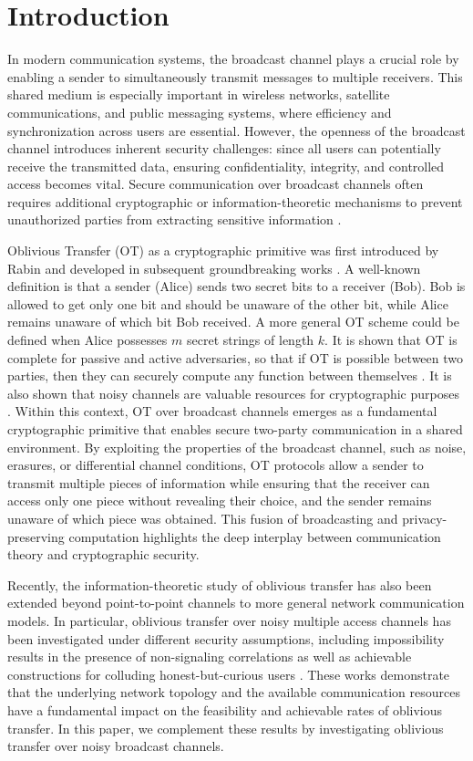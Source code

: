 \documentclass[runningheads]{llncs}
\newcommand{\parbreak}{ \vspace{0.3 em}}
\newcounter{protocol}
\begin{document}
\section{Introduction}
In modern communication systems, the broadcast channel plays a crucial role by enabling a sender to simultaneously transmit messages to multiple receivers. This shared medium is especially important in wireless networks, satellite communications, and public messaging systems, where efficiency and synchronization across users are essential. However, the openness of the broadcast channel introduces inherent security challenges: since all users can potentially receive the transmitted data, ensuring confidentiality, integrity, and controlled access becomes vital. Secure communication over broadcast channels often requires additional cryptographic or information-theoretic mechanisms to prevent unauthorized parties from extracting sensitive information \cite{Korner}. 

\parbreak
Oblivious Transfer (OT) as a cryptographic primitive was first introduced by Rabin \cite{Rabin1} and developed in subsequent groundbreaking works \cite{Kilian1, EGL}. A well-known definition is that a sender (Alice) sends two secret bits to a receiver (Bob). Bob is allowed to get only one bit and should be unaware of the other bit, while Alice remains unaware of which bit Bob received. A more general OT scheme could be defined when Alice possesses $m$ secret strings of length $k$. It is shown that OT is complete for passive and active adversaries, so that if OT is possible between two parties, then they can securely compute any function between themselves \cite{Kilian1}. It is also shown that noisy channels are valuable resources for cryptographic purposes \cite{Joe}. Within this context, OT over broadcast channels emerges as a fundamental cryptographic primitive that enables secure two-party communication in a shared environment. By exploiting the properties of the broadcast channel, such as noise, erasures, or differential channel conditions, OT protocols allow a sender to transmit multiple pieces of information while ensuring that the receiver can access only one piece without revealing their choice, and the sender remains unaware of which piece was obtained. This fusion of broadcasting and privacy-preserving computation highlights the deep interplay between communication theory and cryptographic security.

Recently, the information-theoretic study of oblivious transfer has also been extended beyond point-to-point channels to more general network communication models. In particular, oblivious transfer over noisy multiple access channels has been investigated under different security assumptions, including impossibility results in the presence of non-signaling correlations as well as achievable constructions for colluding honest-but-curious users \cite{Hadi-ISIT26,Hadi-EW26}. These works demonstrate that the underlying network topology and the available communication resources have a fundamental impact on the feasibility and achievable rates of oblivious transfer. In this paper, we complement these results by investigating oblivious transfer over noisy broadcast channels.
\end{document}

